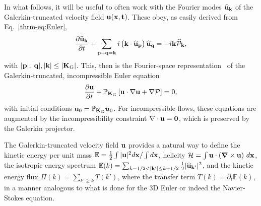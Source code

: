 \documentclass[../Rajarshi-thesis-draft.tex]{subfiles}
\begin{document}
In what follows, it will be useful to often work with the Fourier modes ${\bf \hat{u}_k}$ of the Galerkin-truncated velocity field $\bf u(x,t)$.
These obey, as easily derived from Eq.~\eqref{thrm-eq:Euler},
{\begin{equation}
	\frac{\partial {\bf \hat{u}_k}}{\partial t} + \sum_{\substack{{\bf p}+{\bf q}={\bf k}\\}}
	i  \left ({\bf k}\cdot{\bf \hat{u}_p}\right ){\bf \hat{u}_q}
	= -i {\bf k} {\hat{\mathcal{P}}}_{\bf k},
\label{thrm-eq:GTE_FS}
\end{equation}}
with $|{\bf p}|,|{\bf q}|,|{\bf k}|\le|{\bf K}_{\rm G}|$. This, then is the Fourier-space
representation~\cite{RayThermalReview2015} of the Galerkin-truncated, incompressible Euler equation
\begin{equation}
	\frac{\partial {\bf u}}{\partial t} + \mathbb{P}_{{\bf K}_{\rm G}}\left [{\bf u}\cdot \nabla {\bf u} + \nabla \mathcal{P} \right ] = 0,
\label{thrm-eq:GTE_RS}
\end{equation}
with initial conditions ${\bf u}_0 =  \mathbb{P}_{{\bf K}_{\rm G}}\vec{u}_0$.
For incompressible flows, these equations are augmented by the incompressibility constraint $\bf \nabla \cdot \bf u = 0$,  which is preserved by the Galerkin projector.

{The Galerkin-truncated velocity field ${\bf u}$ provides a natural way to define the
kinetic energy per unit mass $\mathbb{E} = \frac12\int |{\bf u}|^2 d{\bf x}/\int d{\bf x}$, helicity
$\mathcal{H} = \int {\bf u}\cdot(\boldsymbol{\nabla}\times{\bf u}) ~d{\bf x}$,
the isotropic energy spectrum $\mathbb{E}(k) = \sum_{k-1/2 < |\mathbf{k'}| \le k+1/2}
\frac{1}{2}|\hat {\bf u}_{\mathbf{k'}}|^2 $, and the kinetic energy flux  $\Pi(k) = \sum_{k' \ge k} T(k')$, where
the transfer term $T(k) = \partial_t \mathbb{E}(k)$, in a manner analogous
to what is done for the 3D Euler or indeed the Navier-Stokes equation.}
\end{document}

